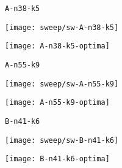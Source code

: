 \begin{figure}[H]
	\begin{minipage}{0.15\textwidth}
		\centering
		\texttt{A-n38-k5}
	\end{minipage}%
	\begin{minipage}{0.40\textwidth}
		\centering
		\texttt{[image: sweep/sw-A-n38-k5]}\par
	\end{minipage}%
	\hspace{0.03\textwidth}
	\begin{minipage}{0.40\textwidth}
		\centering
		\texttt{[image: A-n38-k5-optima]}\par
	\end{minipage}%
\end{figure}

\begin{figure}[H]
	\begin{minipage}{0.15\textwidth}
		\centering
		\texttt{A-n55-k9}
	\end{minipage}%
	\begin{minipage}{0.40\textwidth}
		\centering
		\texttt{[image: sweep/sw-A-n55-k9]}\par
	\end{minipage}%
	\hspace{0.03\textwidth}
	\begin{minipage}{0.40\textwidth}
		\centering
		\texttt{[image: A-n55-k9-optima]}\par
	\end{minipage}%
\end{figure}

\begin{figure}[H]
	\begin{minipage}{0.15\textwidth}
		\centering
		\texttt{B-n41-k6}
	\end{minipage}%
	\begin{minipage}{0.40\textwidth}
		\centering
		\texttt{[image: sweep/sw-B-n41-k6]}\par
	\end{minipage}%
	\hspace{0.03\textwidth}
	\begin{minipage}{0.40\textwidth}
		\centering
		\texttt{[image: B-n41-k6-optima]}\par
	\end{minipage}%
\end{figure}

